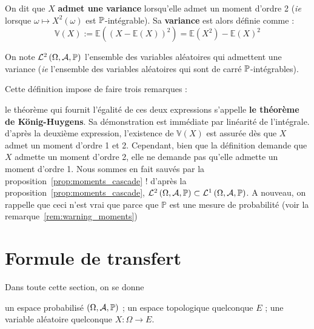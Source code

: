 \documentclass[../integ-proba.tex]{subfiles}
\begin{document}
    \begin{defi}
        On dit que $X$ \textbf{admet une variance} lorsqu'elle admet un moment d'ordre 2 (\textit{ie} lorsque $\omega \mapsto X^2\left(\omega\right)$ est $\mathbb{P}$-intégrable).
        Sa \textbf{variance} est alors définie comme :
        \begin{displaymath}
            \mathbb{V}(X):=\mathbb{E}\left(\left(X - \mathbb{E}\left(X\right)\right)^2\right)=\mathbb{E}\left(X^2\right) - \mathbb{E}\left(X\right)^2
        \end{displaymath}

        On note $\mathcal{L}^2\left(\Omega, \mathcal{A}, \mathbb{P}\right)$ l'ensemble des variables aléatoires qui admettent une variance (\textit{ie} l'ensemble des variables aléatoires qui sont de carré $\mathbb{P}$-intégrables).
    \end{defi}

    \begin{rem}
        Cette définition impose de faire trois remarques :
        \begin{itemize}
            \itemb le théorème qui fournit l'égalité de ces deux expressions s'appelle \textbf{le théorème de König-Huygens}.
            Sa démonstration est immédiate par linéarité de l'intégrale.
            \itemb d'après la deuxième expression, l'existence de $\mathbb{V}(X)$ est assurée dès que $X$ admet un moment d'ordre 1 et 2.
            Cependant, bien que la définition demande que $X$ admette un moment d'ordre 2, elle ne demande pas qu'elle admette un moment d'ordre 1.
            Nous sommes en fait sauvés par la proposition~\ref{prop:moments_cascade} !
            \itemb d'après la proposition~\ref{prop:moments_cascade}, $\mathcal{L}^2\left(\Omega, \mathcal{A}, \mathbb{P}\right) \subset \mathcal{L}^1\left(\Omega, \mathcal{A}, \mathbb{P}\right)$.
            A nouveau, on rappelle que ceci n'est vrai que parce que $\mathbb{P}$ est une mesure de probabilité (voir la remarque~\ref{rem:warning_moments})
        \end{itemize}
    \end{rem}

    \section{Formule de transfert}

    Dans toute cette section, on se donne
    \begin{itemize}
        \itemb un espace probabilisé $\left(\Omega, \mathcal{A}, \mathbb{P}\right)$ ;
        \itemb un espace topologique quelconque $E$ ;
        \itemb une variable aléatoire quelconque $X:\Omega \longrightarrow E$.
    \end{itemize}
\end{document}
